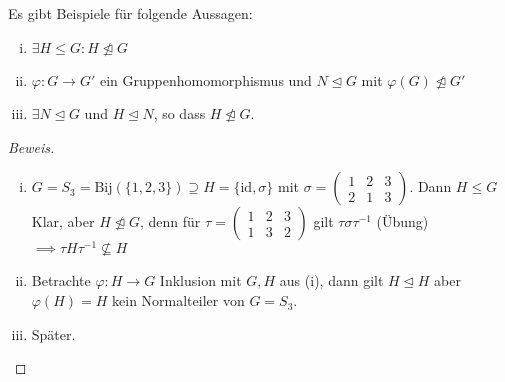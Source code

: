 \documentclass[a4paper]{report}
\begin{document}
\begin{bsp*} Es gibt Beispiele für folgende Aussagen:
  \begin{enumerate}[(i)]
    \item $\exists H \le G : H \not \trianglelefteq G$
    \item $\varphi : G \to G'$ ein Gruppenhomomorphismus und $N \trianglelefteq G$ mit $\varphi(G) \not \trianglelefteq G'$
    \item $\exists N \trianglelefteq G$ und $H \trianglelefteq N$, so dass $H \not \trianglelefteq G$.
  \end{enumerate}
\end{bsp*}
  \begin{proof}[Beweis] \item
  \begin{enumerate}[(i)]
    \item $G = S_{3} = \mathrm{Bij}(\{1,2,3\}) \supseteq H = \{\mathrm{id}, \sigma\}$ mit $\sigma = \begin{pmatrix} 1 & 2 & 3 \\ 2 & 1 & 3\end{pmatrix}$. Dann $H \le G$ Klar, aber $H \not \trianglelefteq G$, denn für $\tau = \begin{pmatrix} 1 & 2 & 3 \\ 1 & 3 & 2\end{pmatrix}$ gilt $\tau \sigma \tau^{-1}$ (Übung) $\implies \tau H\tau^{-1} \not \subseteq H$
    \item Betrachte $\varphi: H \to G$ Inklusion mit $G, H$ aus (i), dann gilt $H \trianglelefteq H$ aber $\varphi(H) = H$ kein Normalteiler von $G = S_{3}$.
    \item Später.
   \end{enumerate}
  \end{proof}
\end{document}
